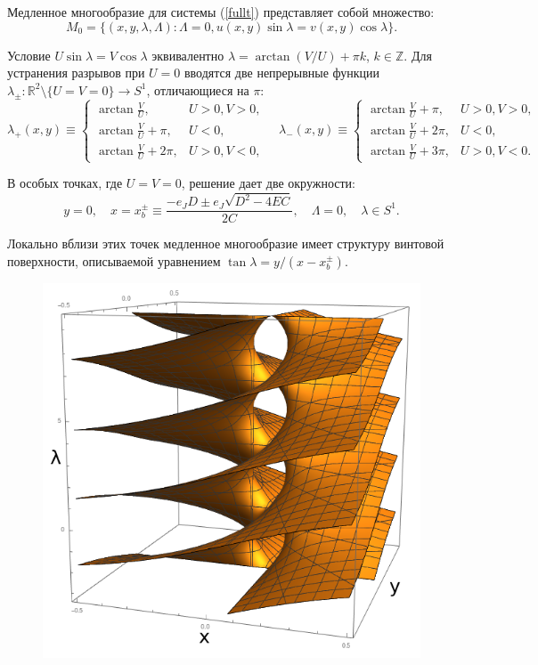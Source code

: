 Медленное многообразие для системы (\ref{fullt}) представляет собой множество:
$$M_0 = \{(x, y, \lambda, \Lambda): \Lambda = 0, u(x,y) \sin \lambda = v(x,y) \cos \lambda \}.$$

Условие $U \sin \lambda = V \cos \lambda$ эквивалентно $\lambda = \arctan(V/U) + \pi k$, $k \in \mathbb{Z}$. Для устранения разрывов при $U = 0$ вводятся две непрерывные функции $\lambda_{\pm}: \mathbb{R}^2 \setminus \{U=V=0\} \to S^1$, отличающиеся на $\pi$:
$$
\lambda_{+}(x,y) \equiv \begin{cases} 
        \arctan \frac{V}{U},        &  U>0, V > 0, \\
        \arctan \frac{V}{U} + \pi,  &  U<0, \\
        \arctan \frac{V}{U} + 2\pi, &  U>0, V<0,
       \end{cases}
\quad
\lambda_{-}(x,y) \equiv \begin{cases} 
        \arctan \frac{V}{U} + \pi,  &  U>0, V > 0, \\
        \arctan \frac{V}{U} + 2\pi, &  U<0, \\
        \arctan \frac{V}{U} + 3\pi, &  U>0, V<0.
       \end{cases}
$$

В особых точках, где $U = V = 0$, решение дает две окружности:
$$y=0,\quad x=x_b^{\pm}\equiv\frac{-e_JD \pm e_J \sqrt{D^2-4EC}}{2C},\quad \Lambda=0,\quad \lambda\in S^1.$$

Локально вблизи этих точек медленное многообразие имеет структуру винтовой поверхности, описываемой уравнением $\tan\lambda = y/(x-x_b^{\pm})$.

\begin{figure}[H]
\centering
\includegraphics[scale=0.55]{../img/MM.png}
\caption{}
\end{figure}

